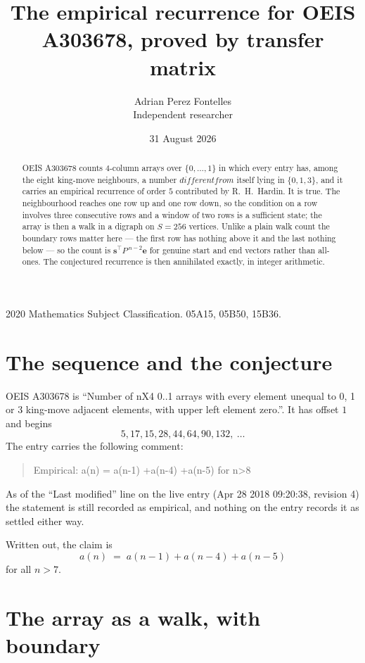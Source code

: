 \documentclass[11pt,a4paper]{article}
\title{The empirical recurrence for OEIS A303678, proved by transfer matrix}
\author{Adrian Perez Fontelles\\ \small Independent researcher}
\date{31 August 2026}
\theoremstyle{plain}
\theoremstyle{definition}
\begin{document}
\maketitle

\begin{abstract}
OEIS A303678 counts $4$-column arrays over $\{0,\dots,1\}$ in which every entry has,
among the eight king-move neighbours, a number $different from$ itself lying in $\{0,1,3\}$, and it carries an empirical
recurrence of order $5$ contributed by R.~H.~Hardin. It is true. The neighbourhood
reaches one row up and one row down, so the condition on a row involves three consecutive
rows and a window of two rows is a sufficient state; the array is then a walk in a digraph
on $S=256$ vertices. Unlike a plain walk count the boundary rows matter here --- the first
row has nothing above it and the last nothing below --- so the count is
$\mathbf{s}^{\!\top}P^{\,n-2}\mathbf{e}$ for genuine start and end vectors rather than
all-ones. The conjectured recurrence is then annihilated exactly, in integer arithmetic.
\end{abstract}

\noindent\small 2020 Mathematics Subject Classification. 05A15, 05B50, 15B36.\normalsize

\section{The sequence and the conjecture}

OEIS A303678 is ``Number of nX4 0..1 arrays with every element unequal to 0, 1 or 3 king-move adjacent elements, with upper left element zero.''. It has offset
$1$ and begins
\[
5, 17, 15, 28, 44, 64, 90, 132,\ \dots
\]
The entry carries the following comment:
\begin{quote}\small
Empirical: a(n) = a(n-1) +a(n-4) +a(n-5) for n>8
\end{quote}
As of the ``Last modified'' line on the live entry (Apr 28 2018 09:20:38, revision
4) the statement is still recorded as empirical, and nothing on the entry
records it as settled either way.

Written out, the claim is
\begin{equation}\label{eq:conj}
a(n)\;=\;a(n-1) + a(n-4) + a(n-5)
\end{equation}
for all $n>7$.

\section{The array as a walk, with boundary}
\end{document}
